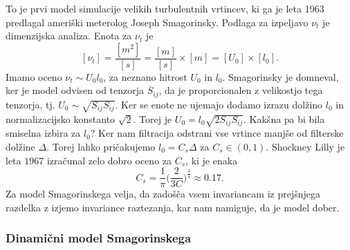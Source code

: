 \documentclass[mat2, tisk]{fmfdelo}
\begin{document}
To je prvi model simulacije velikih turbulentnih vrtincev, ki 
ga je leta 1963 predlagal ameriški meterolog Joseph Smagorinsky.
Podlaga za izpeljavo $\nu_t$ je dimenzijska analiza. Enota za $\nu_t$ je
$$
[\nu_t] = \frac{[m^2]}{[s]} = \frac{[m]}{[s]} \times [m] = [U_0] \times [l_0].
$$
Imamo oceno $\nu_t \sim U_0 l_0$, za neznano hitrost $U_0$ in $l_0$.
Smagorinsky je domneval, ker je model odvisen od tenzorja $\overline{S}_{ij}$, da je 
proporcionalen z velikostjo tega tenzorja, tj. $U_0 \sim \sqrt{S_{ij} S_{ij}}$.
Ker se enote ne ujemajo dodamo izrazu dolžino $l_0$ in normalizacijsko konstanto $\sqrt{2}$.
Torej je $U_0 = l_0\sqrt{2 S_{ij} S_{ij}}$. 
Kakšna pa bi bila smiselna izbira za $l_0$? Ker nam filtracija 
odstrani vse vrtince manjše od filterske dolžine $\Delta$. Torej lahko 
pričakujemo $l_0 = C_s \Delta$ za $C_s\in (0, 1)$. Shockney Lilly je leta $1967$
izračunal zelo dobro oceno za $C_s$, ki je enaka 
$$
C_s = \frac{1}{\pi} \Big(\frac{2}{3C}\Big)^\frac{3}{4} \approx 0.17.
$$
Za model Smagorinskega velja, da zadošča vsem invariancam iz prejšnjega razdelka
z izjemo invariance raztezanja, kar nam namiguje, da je model dober. 

\subsubsection{Dinamični model Smagorinskega}
\end{document}
